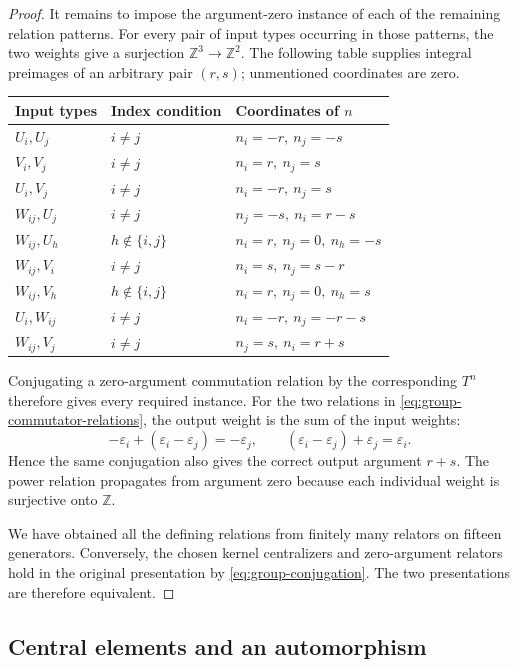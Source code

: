 \documentclass[11pt]{article}
\numberwithin{equation}{section}
\theoremstyle{definition}
\theoremstyle{remark}
\newcommand{\Z}{\mathbb Z}
\begin{document}
\begin{proof}
It remains to impose the argument-zero instance of each of the
remaining relation patterns.  For every pair of input types
occurring in those patterns, the two weights give a surjection
$\Z^3\to\Z^2$.  The following table supplies integral preimages of
an arbitrary pair $(r,s)$; unmentioned coordinates are zero.
\begin{center}
\small
\begin{tabular}{@{}lll@{}}
\toprule
Input types & Index condition & Coordinates of $n$ \\
\midrule
$U_i,U_j$ & $i\neq j$ & $n_i=-r,\ n_j=-s$ \\
$V_i,V_j$ & $i\neq j$ & $n_i=r,\ n_j=s$ \\
$U_i,V_j$ & $i\neq j$ & $n_i=-r,\ n_j=s$ \\
$W_{ij},U_j$ & $i\neq j$ & $n_j=-s,\ n_i=r-s$ \\
$W_{ij},U_h$ & $h\notin\{i,j\}$ &
  $n_i=r,\ n_j=0,\ n_h=-s$ \\
$W_{ij},V_i$ & $i\neq j$ & $n_i=s,\ n_j=s-r$ \\
$W_{ij},V_h$ & $h\notin\{i,j\}$ &
  $n_i=r,\ n_j=0,\ n_h=s$ \\
$U_i,W_{ij}$ & $i\neq j$ & $n_i=-r,\ n_j=-r-s$ \\
$W_{ij},V_j$ & $i\neq j$ & $n_j=s,\ n_i=r+s$ \\
\bottomrule
\end{tabular}
\end{center}
Conjugating a zero-argument commutation relation by the corresponding
$T^n$ therefore gives every required instance.  For the two relations
in \eqref{eq:group-commutator-relations}, the output weight is the sum
of the input weights:
\[
  -\varepsilon_i+(\varepsilon_i-\varepsilon_j)=-\varepsilon_j,
  \qquad
  (\varepsilon_i-\varepsilon_j)+\varepsilon_j=\varepsilon_i.
\]
Hence the same conjugation also gives the correct output argument
$r+s$.  The power relation propagates from argument zero because
each individual weight is surjective onto $\Z$.

We have obtained all the defining relations from finitely many
relators on fifteen generators.  Conversely, the chosen kernel
centralizers and zero-argument relators hold in the original
presentation by \eqref{eq:group-conjugation}.  The two presentations
are therefore equivalent.
\end{proof}

\subsection{Central elements and an automorphism}
\end{document}
